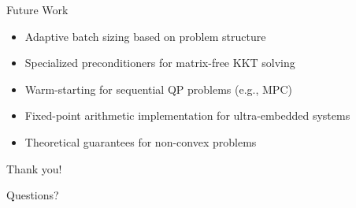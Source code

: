 \documentclass{beamer}
\begin{document}
\begin{frame}{Future Work}
    \begin{itemize}
        \item Adaptive batch sizing based on problem structure
        \item Specialized preconditioners for matrix-free KKT solving
        \item Warm-starting for sequential QP problems (e.g., MPC)
        \item Fixed-point arithmetic implementation for ultra-embedded systems
        \item Theoretical guarantees for non-convex problems
    \end{itemize}
\end{frame}

\begin{frame}
    \centering
    \Huge Thank you!
    
    \vspace{1cm}
    \large Questions?
\end{frame}
\end{document}
